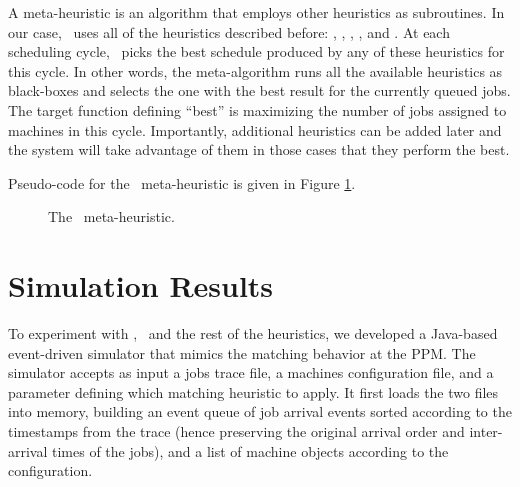 A meta-heuristic is an algorithm that employs other heuristics as
subroutines.
In our case, \maj\ uses all of the heuristics described before: \bfc,
\bfm, \wfc, \wfm, and \mif.
At each scheduling cycle, \maj\ picks the best schedule produced by
any of these heuristics for this cycle.
In other words, the meta-algorithm runs all the available heuristics
as black-boxes and selects the one with the best result for the
currently queued jobs.
The target function defining ``best'' is maximizing the
number of jobs assigned to machines in this cycle.
Importantly, additional heuristics can be added later and the system
will take advantage of them in those cases that they perform the best.

Pseudo-code for the \maj\ meta-heuristic is given in Figure
\ref{fig:max-jobs}.

\begin{figure}\centering
{}
  \caption{The \maj\ meta-heuristic.}
  \label{fig:max-jobs}
\end{figure}


\chapter{Simulation Results}
\label{sec:sim_results}

To experiment with \maj, \mif\ and the rest of the heuristics, we
developed a Java-based event-driven simulator \cite{simba} that mimics the
matching behavior at the PPM.
The simulator accepts as input a jobs trace file, 
a machines configuration file, and a parameter defining which matching heuristic
to apply.
It first loads the two files into memory, building an event queue of
job arrival events sorted according to the timestamps from the trace 
(hence preserving the original arrival order and inter-arrival times of the jobs), 
and a list of machine objects according to the configuration.

